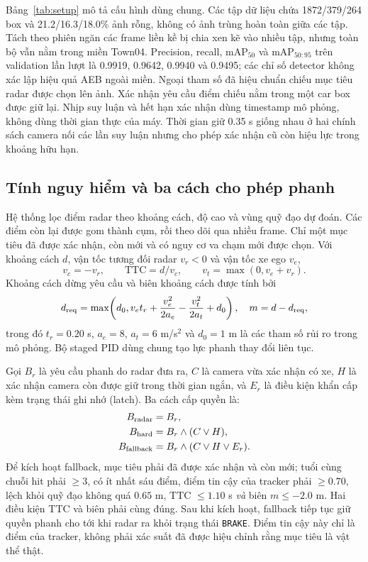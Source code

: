 \documentclass[conference]{IEEEtran}
\begin{document}
Bảng~\ref{tab:setup} mô tả cấu hình dùng chung. Các tập dữ liệu chứa
1872/379/264 box và 21.2/16.3/18.0\% ảnh rỗng, không có ảnh trùng hoàn toàn
giữa các tập. Tách theo phiên ngăn các frame liền kề bị chia xen kẽ vào nhiều
tập, nhưng toàn bộ vẫn nằm trong miền Town04. Precision, recall,
$\mathrm{mAP}_{50}$ và $\mathrm{mAP}_{50:95}$ trên validation lần lượt là
0.9919, 0.9642, 0.9940 và 0.9495; các chỉ số detector không xác lập hiệu quả
AEB ngoài miền. Ngoại tham số đã hiệu chuẩn chiếu mục tiêu radar được chọn
lên ảnh. Xác nhận yêu cầu điểm chiếu nằm trong một car box được giữ lại.
Nhịp suy luận và hết hạn xác nhận dùng timestamp mô phỏng, không dùng thời
gian thực của máy. Thời gian giữ 0.35 s giống nhau ở hai chính sách camera
nối các lần suy luận nhưng cho phép xác nhận cũ còn hiệu lực trong khoảng
hữu hạn.

\subsection{Tính nguy hiểm và ba cách cho phép phanh}
Hệ thống lọc điểm radar theo khoảng cách, độ cao và vùng quỹ đạo dự đoán.
Các điểm còn lại được gom thành cụm, rồi theo dõi qua nhiều frame. Chỉ một
mục tiêu đã được xác nhận, còn mới và có nguy cơ va chạm mới được chọn. Với
khoảng cách $d$, vận tốc tương đối radar $v_r<0$ và vận tốc xe ego $v_e$,
\begin{equation}
v_c=-v_r,\qquad \mathrm{TTC}=d/v_c,\qquad v_t=\max(0,v_e+v_r).
\end{equation}
Khoảng cách dừng yêu cầu và biên khoảng cách được tính bởi
\begin{equation}
d_{\rm req}=\max\!\left(d_0,v_et_r+\frac{v_e^2}{2a_e}-\frac{v_t^2}{2a_t}+d_0\right),
\quad m=d-d_{\rm req},
\end{equation}
trong đó $t_r=0.20$ s, $a_e=8$, $a_t=6$ m/s$^2$ và $d_0=1$ m là các tham số
rủi ro trong mô phỏng. Bộ staged PID dùng chung tạo lực phanh thay đổi liên tục.

Gọi $B_r$ là yêu cầu phanh do radar đưa ra, $C$ là camera vừa xác nhận có xe,
$H$ là xác nhận camera còn được giữ trong thời gian ngắn, và $E_r$ là điều
kiện khẩn cấp kèm trạng thái ghi nhớ (latch). Ba cách cấp quyền là:
\begin{align}
 B_{\rm radar}&=B_r,\\
 B_{\rm hard}&=B_r\land(C\lor H),\\
 B_{\rm fallback}&=B_r\land(C\lor H\lor E_r).
\end{align}
Để kích hoạt fallback, mục tiêu phải đã được xác nhận và còn mới; tuổi cùng
chuỗi hit phải $\geq3$, có ít nhất sáu điểm, điểm tin cậy của tracker phải
$\geq0.70$, lệch khỏi quỹ đạo không quá $0.65$ m, TTC $\leq1.10$ s
\emph{và} biên $m\leq-2.0$ m. Hai điều kiện TTC và biên phải cùng đúng.
Sau khi kích hoạt, fallback tiếp tục giữ quyền phanh cho tới khi radar ra khỏi
trạng thái \texttt{BRAKE}. Điểm tin cậy này chỉ là điểm của tracker, không phải
xác suất đã được hiệu chỉnh rằng mục tiêu là vật thể thật.
\end{document}
